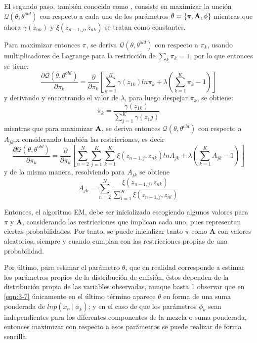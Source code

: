 El segundo paso, también conocido como \mstep, consiste en maximizar la unción $\mathcal{Q}(\theta, \theta^{old})$ con respecto a cada uno de los parámetros $\theta = \lbrace \pi, \textbf{A}, \phi \rbrace$ mientras que ahora $\gamma(z_{nk})$ y $\xi(z_{n-1,j}, z_{nk})$ se tratan como constantes.

Para maximizar entonces $\pi$, se deriva $\mathcal{Q}(\theta, \theta^{old})$ con respecto a $\pi_k$, usando multiplicadores de Lagrange para la restricción de $\sum_k \pi_k = 1$, por lo que entonces se tiene: 
\begin{equation*}
  \frac {\partial \mathcal{Q}(\theta, \theta^{old})}{\partial \pi_k} = 
  \frac {\partial}{\partial \pi_k} 
  \left[
    \sum_{k=1}^K \gamma(z_{1k}) ln \pi_k + \lambda (\sum_{k=1}^K \pi_k - 1) 
  \right]
\end{equation*}
y derivando y encontrando el valor de $\lambda$, para luego despejar $\pi_k$, se obtiene:
\begin{equation}
  \pi_k = \frac{\gamma(z_{1k})}{\sum_{j=1}^K \gamma(z_1j)}
\label{eqn:3-8}
\end{equation}
mientras que para maximizar $\textbf{A}$, se deriva entonces $\mathcal{Q}(\theta, \theta^{old})$ con respecto a $A_{jk}$,x considerando también las restricciones, es decir
\begin{equation*}
  \frac {\partial \mathcal{Q}(\theta, \theta^{old})}{\partial \pi_k} = 
  \frac {\partial}{\partial \pi_k} 
  \left[
    \sum_{n=2}^N \sum_{j=1}^K \sum_{k=1}^K \xi(z_{n-1,j}, z_{nk}) ln A_{jk} 
    + \lambda (\sum_{k=1}^K A_{jk} - 1) 
  \right]
\end{equation*}
y de la misma manera, resolviendo para $A_{jk}$ se obtiene
\begin{equation}
A_{jk} = \sum_{n=2}^N 
  \frac{\xi(z_{n-1,j}, z_{nk})}
  {\sum_{l=1}^K \xi(z_{n-1,j}, z_{nl})}
\label{eqn:3-9}
\end{equation}

Entonces, el algoritmo EM, debe ser inicializado escogiendo algunos valores para $\pi$ y $\mathbf{A}$, considerando las restricciones que implican cada uno, pues representan ciertas probabilidades. Por tanto, se puede inicializar tanto $\pi$ como $\mathbf{A}$ con valores aleatorios, siempre y cuando cumplan con las restricciones propias de una probabilidad. 

Por último, para estimar el parámetro $\theta$, que en realidad corresponde a estimar los parámetros propios de la distribución de emisión, éstos dependen de la distribución propia de las variables observadas, aunque basta 1 observar que en \eqref{eqn:3-7} únicamente en el último término aparece $\theta$ en forma de una suma ponderada de $ln p(x_n ~|~  \phi_k)$; y en el caso de que los parámetros $\phi_k$ sean independientes para los diferentes componentes de la mezcla o suma ponderada, entonces maximizar con respecto a esos parámetros se puede realizar de forma sencilla.

